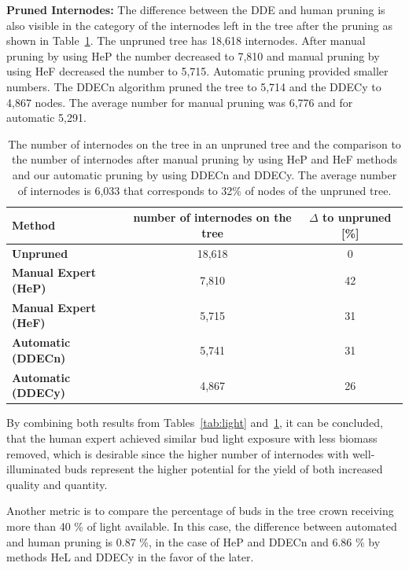 \noindent\textbf{Pruned Internodes:} The difference between the DDE and human pruning is also visible in the category of the internodes left in the tree after the pruning as shown in Table~\ref{tab:inodes}. The unpruned tree has 18,618 internodes. After manual pruning by using HeP the number decreased to 7,810 and manual pruning by using HeF decreased the number to 5,715. Automatic pruning provided smaller numbers. The DDECn algorithm pruned the tree to 5,714 and the DDECy to 4,867 nodes. The average number for manual pruning was 6,776 and for automatic 5,291.
\begin{table}[hbt]
\begin{center}
\begin{tabular}{ |l|c|c| } 
 \hline
 \textbf{Method} & number of internodes on the tree  & $\Delta$ to unpruned [\%] \\ 
  \hline
 \textbf{Unpruned}            & 18,618 & 0 \\ 
 \hline
 \textbf{Manual Expert (HeP)} & 7,810 & 42 \\ 
 \textbf{Manual Expert (HeF)} & 5,715 & 31 \\ 
  \hline
 \textbf{Automatic (DDECn)} & 5,741 & 31 \\ 
 \textbf{Automatic (DDECy)} & 4,867 & 26 \\ 
 \hline
\end{tabular}
\end{center}
\caption{The number of internodes on the tree in an unpruned tree and the comparison to the number of internodes after manual pruning by using HeP and HeF methods and our automatic pruning by using DDECn and DDECy. The average number of internodes is 6,033 that corresponds to 32\% of nodes of the unpruned tree. }
\label{tab:inodes}
\end{table}

By combining both results from Tables~\ref{tab:light} and~\ref{tab:inodes}, 
it can be concluded, that the human expert
achieved similar bud light exposure with less biomass removed,
which is desirable since the higher number of internodes with
well-illuminated buds represent the higher potential for the yield of
both increased quality and quantity. 

Another metric is to compare the
percentage of buds in the tree crown receiving more than 40 \% of light
available. In this case, the difference between automated and human
pruning is 0.87 \%, in the case of HeP and DDECn and 6.86 \% by methods  HeL and DDECy in the favor of the later.

